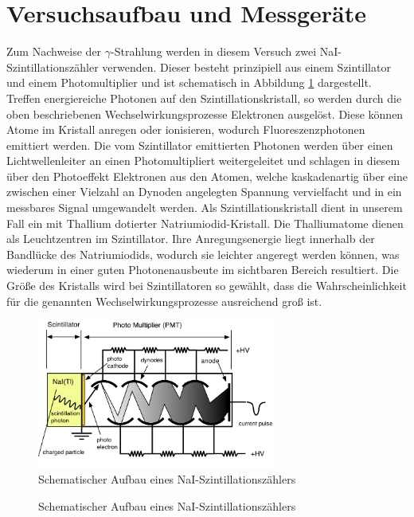 \documentclass[11pt]{scrartcl}
\begin{document}
\section{Versuchsaufbau und Messgeräte}

Zum Nachweise der $\gamma$-Strahlung werden in diesem Versuch zwei NaI-Szintillationszähler verwenden. Dieser besteht prinzipiell aus einem Szintillator und einem Photomultiplier und ist schematisch in Abbildung \ref{PMT} dargestellt. Treffen energiereiche Photonen auf den Szintillationskristall, so werden durch die oben beschriebenen Wechselwirkungsprozesse Elektronen ausgelöst. Diese können Atome im Kristall anregen oder ionisieren, wodurch Fluoreszenzphotonen emittiert werden. Die vom Szintillator emittierten Photonen werden über einen Lichtwellenleiter an einen Photomultipliert weitergeleitet und schlagen in diesem über den Photoeffekt Elektronen aus den Atomen, welche kaskadenartig über eine zwischen einer Vielzahl an Dynoden angelegten Spannung vervielfacht und in ein messbares Signal umgewandelt werden. Als Szintillationskristall dient in unserem Fall ein mit Thallium dotierter Natriumiodid-Kristall. Die Thalliumatome dienen als Leuchtzentren im Szintillator. Ihre Anregungsenergie liegt innerhalb der Bandlücke des Natriumiodids, wodurch sie leichter angeregt werden können, was wiederum in einer guten Photonenausbeute im sichtbaren Bereich resultiert. Die Größe des Kristalls wird bei Szintillatoren so gewählt, dass die Wahrscheinlichkeit für die genannten Wechselwirkungsprozesse ausreichend groß ist. 

\begin{figure}[htbp]  
     \includegraphics[width=0.7\textwidth]{PMT.png}
  \caption{Schematischer Aufbau eines NaI-Szintillationszählers}
  \label{PMT}
\end{figure}


\begin{figure}[htbp]  
     
  \caption{Schematischer Aufbau eines NaI-Szintillationszählers}
  \label{PMT2}
\end{figure}
\end{document}
